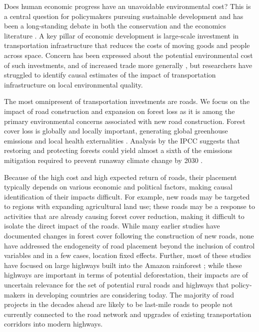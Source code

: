 Does human economic progress have an unavoidable environmental cost?
This is a central question for policymakers pursuing sustainable
development and has been a long-standing debate in both the
conservation and the economics literature
\cite{AD95,GK95,SCB96,AL01,FR03,D07,AMSW13}. A key pillar of economic
development is large-scale investment in transportation infrastructure
that reduces the costs of moving goods and people across
space. Concern has been expressed about the potential environmental
cost of such investments, and of increased trade more generally
\cite{CT94,ACT01,CT04,FR05}, but researchers have struggled to
identify causal estimates of the impact of transportation
infrastructure on local environmental quality.

The most omnipresent of transportation investments are roads. We focus
on the impact of road construction and expansion on forest loss as it
is among the primary environmental concerns associated with new road
construction.  Forest cover loss is globally and locally important,
generating global greenhouse emissions \cite{IPCC,JS17} and local
health externalities \cite{BBPS15,TG17}. Analysis by the IPCC suggests
that restoring and protecting forests could yield almost a sixth of
the emissions mitigation required to prevent runaway climate change by
2030 \cite{IPCC18}.

Because of the high cost and high expected return of roads, their
placement typically depends on various economic and political factors,
making causal identification of their impacts difficult.  For example,
new roads may be targeted to regions with expanding agricultural land
use; these roads may be a response to activities that are already
causing forest cover reduction, making it difficult to isolate the
direct impact of the roads.  While many earlier studies have
documented changes in forest cover following the construction of new
roads, none have addressed the endogeneity of road placement beyond
the inclusion of control variables and in a few cases, location fixed
effects. Further, most of these studies have focused on large highways
built into the Amazon rainforest \cite{AP99,PR07,WR08}; while these
highways are important in terms of potential deforestation, their
impacts are of uncertain relevance for the set of potential rural
roads and highways that policy-makers in developing countries are
considering today. The majority of road projects in the decades ahead
are likely to be last-mile roads to people not currently connected to
the road network and upgrades of existing transportation corridors
into modern highways.


